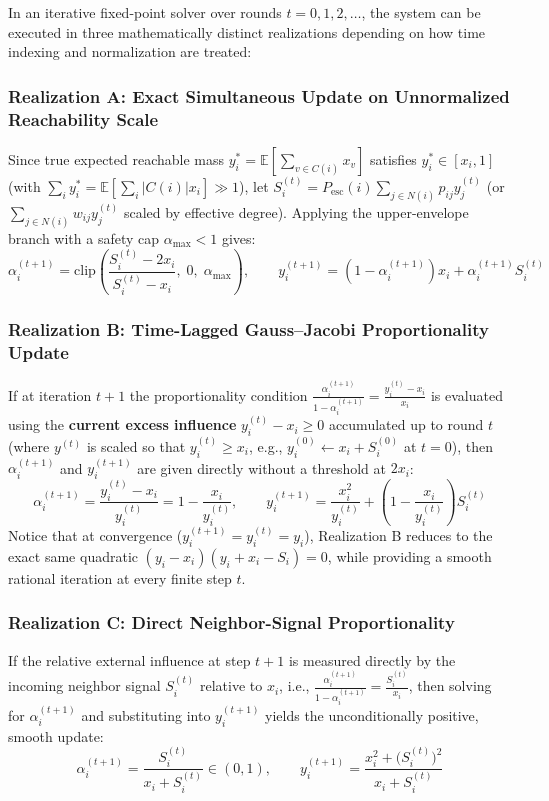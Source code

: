 \documentclass[11pt, a4paper]{article}
\begin{document}
In an iterative fixed-point solver over rounds $t = 0, 1, 2, \dots$, the system can be executed in three mathematically distinct realizations depending on how time indexing and normalization are treated:

\subsubsection*{Realization A: Exact Simultaneous Update on Unnormalized Reachability Scale}
Since true expected reachable mass $y^*_i = \mathbb{E}[\sum_{v \in C(i)} x_v]$ satisfies $y^*_i \in [x_i, 1]$ (with $\sum_i y^*_i = \mathbb{E}[\sum_i |C(i)| x_i] \gg 1$), let $S_i^{(t)} = P_{\mathrm{esc}}(i) \sum_{j \in N(i)} p_{ij} y_j^{(t)}$ (or $\sum_{j \in N(i)} w_{ij} y_j^{(t)}$ scaled by effective degree). Applying the upper-envelope branch with a safety cap $\alpha_{\max} < 1$ gives:
\[
\alpha_i^{(t+1)} = \mathrm{clip}\!\left(\frac{S_i^{(t)} - 2x_i}{S_i^{(t)} - x_i},\; 0,\; \alpha_{\max}\right), \qquad y_i^{(t+1)} = \left(1 - \alpha_i^{(t+1)}\right) x_i + \alpha_i^{(t+1)} S_i^{(t)}
\]

\subsubsection*{Realization B: Time-Lagged Gauss--Jacobi Proportionality Update}
If at iteration $t+1$ the proportionality condition $\frac{\alpha_i^{(t+1)}}{1 - \alpha_i^{(t+1)}} = \frac{y_i^{(t)} - x_i}{x_i}$ is evaluated using the \textbf{current excess influence} $y_i^{(t)} - x_i \ge 0$ accumulated up to round $t$ (where $y^{(t)}$ is scaled so that $y_i^{(t)} \ge x_i$, e.g., $y_i^{(0)} \leftarrow x_i + S_i^{(0)}$ at $t=0$), then $\alpha_i^{(t+1)}$ and $y_i^{(t+1)}$ are given directly without a threshold at $2x_i$:
\[
\boxed{\;\alpha_i^{(t+1)} = \frac{y_i^{(t)} - x_i}{y_i^{(t)}} = 1 - \frac{x_i}{y_i^{(t)}}, \qquad y_i^{(t+1)} = \frac{x_i^2}{y_i^{(t)}} + \left(1 - \frac{x_i}{y_i^{(t)}}\right) S_i^{(t)}\;}
\]
Notice that at convergence ($y_i^{(t+1)} = y_i^{(t)} = y_i$), Realization B reduces to the exact same quadratic $(y_i - x_i)(y_i + x_i - S_i) = 0$, while providing a smooth rational iteration at every finite step $t$.

\subsubsection*{Realization C: Direct Neighbor-Signal Proportionality}
If the relative external influence at step $t+1$ is measured directly by the incoming neighbor signal $S_i^{(t)}$ relative to $x_i$, i.e., $\frac{\alpha_i^{(t+1)}}{1 - \alpha_i^{(t+1)}} = \frac{S_i^{(t)}}{x_i}$, then solving for $\alpha_i^{(t+1)}$ and substituting into $y_i^{(t+1)}$ yields the unconditionally positive, smooth update:
\[
\boxed{\;\alpha_i^{(t+1)} = \frac{S_i^{(t)}}{x_i + S_i^{(t)}} \in (0,1), \qquad y_i^{(t+1)} = \frac{x_i^2 + \big(S_i^{(t)}\big)^2}{x_i + S_i^{(t)}}\;}
\]
\end{document}
